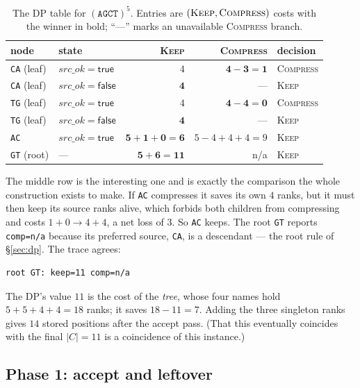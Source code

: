 \documentclass[11pt,a4paper]{article}
\theoremstyle{definition}
\theoremstyle{plain}
\theoremstyle{remark}
\newcommand{\KEEP}{\textnormal{\textsc{Keep}}}
\newcommand{\COMP}{\textnormal{\textsc{Compress}}}
\begin{document}
\begin{table}[h]
\centering
\caption{The DP table for $(\mathtt{AGCT})^5$. Entries are
  $(\KEEP, \COMP)$ costs with the winner in bold; ``---'' marks an
  unavailable \COMP{} branch.}
\label{tab:dp}
\begin{tabular}{llrrl}
\toprule
node & state & \KEEP{} & \COMP{} & decision \\
\midrule
\texttt{CA} (leaf) & $\mathit{src\_ok} = \mathsf{true}$
  & $4$ & $\mathbf{4 - 3 = 1}$ & \COMP \\
\texttt{CA} (leaf) & $\mathit{src\_ok} = \mathsf{false}$
  & $\mathbf{4}$ & --- & \KEEP \\
\midrule
\texttt{TG} (leaf) & $\mathit{src\_ok} = \mathsf{true}$
  & $4$ & $\mathbf{4 - 4 = 0}$ & \COMP \\
\texttt{TG} (leaf) & $\mathit{src\_ok} = \mathsf{false}$
  & $\mathbf{4}$ & --- & \KEEP \\
\midrule
\texttt{AC} & $\mathit{src\_ok} = \mathsf{true}$
  & $\mathbf{5 + 1 + 0 = 6}$ & $5 - 4 + 4 + 4 = 9$ & \KEEP \\
\midrule
\texttt{GT} (root) & ---
  & $\mathbf{5 + 6 = 11}$ & n/a & \KEEP \\
\bottomrule
\end{tabular}
\end{table}

The middle row is the interesting one and is exactly the comparison the
whole construction exists to make. If \texttt{AC} compresses it saves
its own $4$ ranks, but it must then keep its source ranks alive, which
forbids both children from compressing and costs $1 + 0 \to 4 + 4$, a
net loss of $3$. So \texttt{AC} keeps. The root \texttt{GT} reports
\texttt{comp=n/a} because its preferred source, \texttt{CA}, is a
descendant --- the root rule of \S\ref{sec:dp}. The trace agrees:

\begin{verbatim}
root GT: keep=11 comp=n/a
\end{verbatim}

The DP's value $11$ is the cost of the \emph{tree}, whose four names
hold $5+5+4+4 = 18$ ranks; it saves $18 - 11 = 7$. Adding the three
singleton ranks gives $14$ stored positions after the accept pass. (That
this eventually coincides with the final $|C| = 11$ is a coincidence of
this instance.)

\subsection{Phase 1: accept and leftover}
\end{document}
